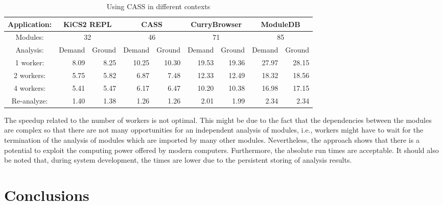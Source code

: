 \documentclass{llncs}
\begin{document}
\begin{table}[t]
\begin{center}
\begin{tabular}{|c|*{8}{r|}}
\hline
Application: & \multicolumn{2}{c|}{KiCS2 REPL} & \multicolumn{2}{c|}{CASS} & \multicolumn{2}{c|}{CurryBrowser} & \multicolumn{2}{c|}{ModuleDB} \\
\hline
Modules:     & \multicolumn{2}{c|}{ 32  } & \multicolumn{2}{c|}{ 46 } & \multicolumn{2}{c|}{  71   } & \multicolumn{2}{c|}{  85    } \\
\hline
Analysis:  & Demand & Ground & Demand & Ground & Demand & Ground & Demand & Ground \\
\hline
1 worker:  & 8.09 & 8.25 & 10.25 & 10.30 & 19.53 & 19.36 & 27.97 & 28.15 \\
\hline
2 workers: & 5.75 & 5.82 &  6.87 &  7.48 & 12.33 & 12.49 & 18.32 & 18.56 \\
\hline
4 workers: & 5.41 & 5.47 &  6.17 &  6.47 & 10.20 & 10.38 & 16.98 & 17.15 \\
\hline
Re-analyze:& 1.40 & 1.38 &  1.26 &  1.26 &  2.01 &  1.99 &  2.34 &  2.34 \\
\hline
\end{tabular}
\end{center}
\caption{Using CASS in different contexts\label{table:benchmarks}}
\end{table}

The speedup related to the number of workers is not optimal.
This might be due to the fact that the dependencies between the modules
are complex so that there are not many opportunities for an independent
analysis of modules, i.e., workers might have to wait for the
termination of the analysis of modules which are imported by many
other modules.
Nevertheless, the approach shows that there is a potential to exploit
the computing power offered by modern computers.
Furthermore, the absolute run times are acceptable.
It should also be noted that, during system development, the times are lower
due to the persistent storing of analysis results.


\section{Conclusions}
\label{sec:conclusions}
\end{document}
